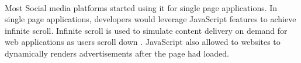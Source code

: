 \paragraph{}
Most Social media platforms started using it for single page applications. In single page applications, developers would leverage JavaScript features to achieve infinite scroll. Infinite scroll is used to simulate content delivery on demand for web applications as users scroll down \cite{ctx2425553500004041}. JavaScript also allowed to websites to dynamically renders advertisements after the page had loaded.



